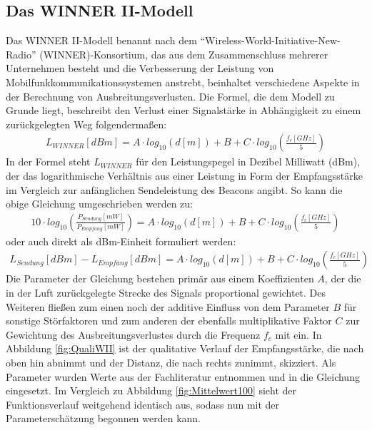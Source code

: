 \subsection{Das WINNER II-Modell}
Das WINNER II-Modell \cite{WII} benannt nach dem "`Wireless-World-Initiative-New-Radio"' (WINNER)-Konsortium, das aus dem Zusammenschluss mehrerer Unternehmen besteht und die Verbesserung der Leistung von Mobilfunkkommunikationssystemen anstrebt, beinhaltet verschiedene Aspekte in der Berechnung von Ausbreitungsverlusten. Die Formel, die dem Modell zu Grunde liegt, beschreibt den Verlust einer Signalstärke in Abhängigkeit zu einem zurückgelegten Weg folgendermaßen:
\begin{align*}
L_{WINNER}\left [ dBm \right ]=A\cdot log_{10}\left (d\left [ m \right ]\right ) + B + C\cdot log_{10}\left (\frac{f_c\left [ GHz \right ]}{5}\right )
\end{align*}
In der Formel steht $L_{WINNER}$ für den Leistungspegel in Dezibel Milliwatt (dBm), der das logarithmische Verhältnis aus einer Leistung in Form der Empfangsstärke im Vergleich zur anfänglichen Sendeleistung des Beacons angibt. So kann die obige Gleichung umgeschrieben werden zu:
\begin{align*}
10\cdot log_{10}\left (\frac{P_{Sendung}\left [ mW \right ]}{P_{Empfang}\left [ mW \right ]}\right )=A\cdot log_{10}\left (d\left [ m \right ]\right ) + B + C\cdot log_{10}\left (\frac{f_c\left [ GHz \right ]}{5}\right )
\end{align*}
oder auch direkt als dBm-Einheit formuliert werden:
\begin{align}
L_{Sendung}\left [ dBm \right ] - L_{Empfang}\left [ dBm \right ]=A\cdot log_{10}\left (d\left [ m \right ]\right ) + B + C\cdot log_{10}\left (\frac{f_c\left [ GHz \right ]}{5}\right ) \label{eq:WII}
\end{align}
Die Parameter der Gleichung bestehen primär aus einem Koeffizienten $A$, der die in der Luft zurückgelegte Strecke des Signals proportional gewichtet. Des Weiteren fließen zum einen noch der additive Einfluss von dem Parameter $B$ für sonstige Störfaktoren und zum anderen der ebenfalls multiplikative Faktor $C$ zur Gewichtung des Ausbreitungsverlustes durch die Frequenz $f_c$ mit ein. In Abbildung \ref{fig:QualiWII} ist der qualitative Verlauf der Empfangsstärke, die nach oben hin abnimmt und der Distanz, die nach rechts zunimmt, skizziert. Als Parameter wurden Werte aus der Fachliteratur \cite{Kanal} entnommen und in die Gleichung eingesetzt. Im Vergleich zu Abbildung \ref{fig:Mittelwert100} sieht der Funktionsverlauf weitgehend identisch aus, sodass nun mit der Parameterschätzung begonnen werden kann.  
